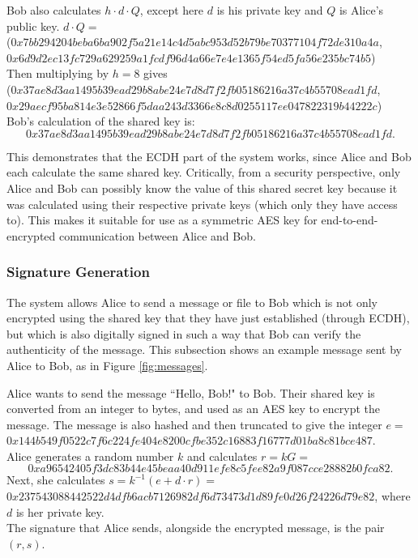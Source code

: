 \documentclass[12pt,a4paper]{article}
\begin{document}
Bob also calculates $h \cdot d \cdot Q$, except here $d$ is his private key and $Q$ is Alice's public key. 
$d \cdot Q = $ \\
({\footnotesize $0x7bb294204beba6ba902f5a21e14c4d5abc953d52b79be70377104f72de310a4a$}, \\
{\footnotesize $0x6d9d2ec13fc729a629259a1fcdf96d4a66e7e4e1365f54ed5fa56e235bc74b5$}) \\
Then multiplying by $h = 8$ gives \\
({\footnotesize $0x37ae8d3aa1495b39ead29b8abe24e7d8d7f2fb05186216a37c4b55708ead1fd$}, \\
{\footnotesize $0x29aecf95ba814e3e52866f5daa243d3366e8c8d0255117ee047822319b44222c$}) \\
Bob's calculation of the shared key is: 
\begin{equation}
    0x37ae8d3aa1495b39ead29b8abe24e7d8d7f2fb05186216a37c4b55708ead1fd.
\end{equation}

This demonstrates that the ECDH part of the system works, since Alice and Bob each calculate the same shared key. 
Critically, from a security perspective, only Alice and Bob can possibly know the value of this shared secret key 
because it was calculated using their respective private keys (which only they have access to). 
This makes it suitable for use as a symmetric AES key for end-to-end-encrypted communication between Alice and Bob. 


\subsubsection{Signature Generation}
The system allows Alice to send a message or file to Bob which is not only encrypted using the shared key that they have just established (through ECDH), 
but which is also digitally signed in such a way that Bob can verify the authenticity of the message. 
This subsection shows an example message sent by Alice to Bob, as in Figure \ref{fig:messages}. 

Alice wants to send the message ``Hello, Bob!" to Bob. 
Their shared key is converted from an integer to bytes, and used as an AES key to encrypt the message. 
The message is also hashed and then truncated to give the integer $e =$ \\
{\footnotesize $0x144b549f0522c7f6c224fe404e8200cfbe352c16883f16777d01ba8c81bce487$}. \\
Alice generates a random number $k$ and calculates $r = kG =$ 
\begin{equation}
    0xa96542405f3dc83b44e45beaa40d911efe8c5fee82a9f087cce28882b0fca82.
\end{equation}
Next, she calculates $s = k^{-1}(e + d \cdot r) =$ \\
{\footnotesize $0x237543088442522d4dfb6acb7126982df6d73473d1d89fe0d26f24226d79e82$}, where $d$ is her private key. \\
The signature that Alice sends, alongside the encrypted message, is the pair $(r,s)$. 
\end{document}
